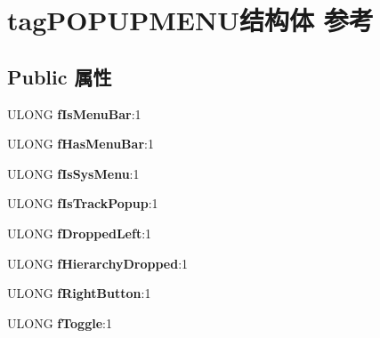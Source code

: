 \hypertarget{structtag_p_o_p_u_p_m_e_n_u}{}\section{tag\+P\+O\+P\+U\+P\+M\+E\+N\+U结构体 参考}
\label{structtag_p_o_p_u_p_m_e_n_u}
\subsection*{Public 属性}
\begin{DoxyCompactItemize}
\item 
\mbox{\label{structtag_p_o_p_u_p_m_e_n_u_aa9a6133726cfb40ed6a80519b34a8db5}} 
U\+L\+O\+NG {\bfseries f\+Is\+Menu\+Bar}\+:1
\item 
\mbox{\label{structtag_p_o_p_u_p_m_e_n_u_ae5c5f0cbcf9fdf72387a1e7351a4ecf1}} 
U\+L\+O\+NG {\bfseries f\+Has\+Menu\+Bar}\+:1
\item 
\mbox{\label{structtag_p_o_p_u_p_m_e_n_u_abeb53d1246bf013749c7349db98ec9c5}} 
U\+L\+O\+NG {\bfseries f\+Is\+Sys\+Menu}\+:1
\item 
\mbox{\label{structtag_p_o_p_u_p_m_e_n_u_afaa68541b3d845fd4d1ea56ff76b5409}} 
U\+L\+O\+NG {\bfseries f\+Is\+Track\+Popup}\+:1
\item 
\mbox{\label{structtag_p_o_p_u_p_m_e_n_u_af3ab742120ecd78bb70829b735757f01}} 
U\+L\+O\+NG {\bfseries f\+Dropped\+Left}\+:1
\item 
\mbox{\label{structtag_p_o_p_u_p_m_e_n_u_a561e4c9bb9e4c816aabf4bea8a793438}} 
U\+L\+O\+NG {\bfseries f\+Hierarchy\+Dropped}\+:1
\item 
\mbox{\label{structtag_p_o_p_u_p_m_e_n_u_a0926511f4f5d17534145b18d6fb6d65a}} 
U\+L\+O\+NG {\bfseries f\+Right\+Button}\+:1
\item 
\mbox{\label{structtag_p_o_p_u_p_m_e_n_u_a77fd0b42b0a163f4d8712ba7f07b7a3c}} 
U\+L\+O\+NG {\bfseries f\+Toggle}\+:1
\item 

\end{DoxyCompactItemize}
